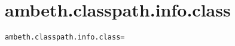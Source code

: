 \section{ambeth.classpath.info.class}
\label{configuration:AmbethClasspathInfoClass}
\ClearAPI
\TODO%
\begin{lstlisting}[style=Props,caption={Usage example for \textit{ambeth.classpath.info.class}}]
ambeth.classpath.info.class=
\end{lstlisting}
